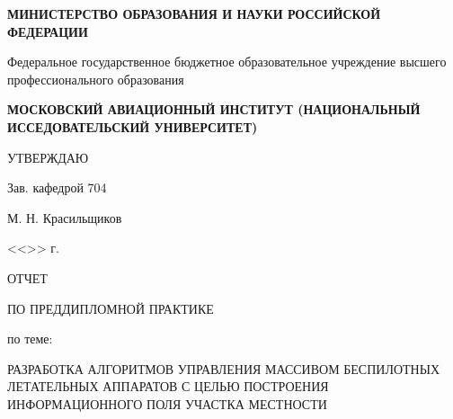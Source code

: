 \begin{titlepage}
\newpage

\def\tlb{\tabularnewline}

\begin{center}

    \textbf{МИНИСТЕРСТВО ОБРАЗОВАНИЯ И НАУКИ\lb
    РОССИЙСКОЙ ФЕДЕРАЦИИ}

    \vspace{0.5em}
    Федеральное государственное бюджетное образовательное учреждение\lb
    высшего профессионального образования
    \vspace{0.5em}

    \textbf{МОСКОВСКИЙ АВИАЦИОННЫЙ ИНСТИТУТ\lb
    (НАЦИОНАЛЬНЫЙ ИССЕДОВАТЕЛЬСКИЙ УНИВЕРСИТЕТ)}

\end{center}

\vspace{1.5em}

\begin{flushright}
    \begin{center}
        \hspace{10cm}
        УТВЕРЖДАЮ
    \end{center}

    \begin{flushleft}
        \hspace{10.5cm}
        Зав. кафедрой 704
    \end{flushleft}

    \underline{\hspace{3cm}} М. Н. Красильщиков

    <<\underline{\hspace{0.7cm}}>> \underline{\hspace{3.5cm}} \underline{\hspace{1.5cm}}г.

\end{flushright}

\begin{center}
    ОТЧЕТ

    ПО ПРЕДДИПЛОМНОЙ ПРАКТИКЕ

    \vspace{0.5em}

    по теме:

    \vspace{0.5em}

    РАЗРАБОТКА АЛГОРИТМОВ УПРАВЛЕНИЯ МАССИВОМ БЕСПИЛОТНЫХ
    ЛЕТАТЕЛЬНЫХ АППАРАТОВ С ЦЕЛЬЮ ПОСТРОЕНИЯ ИНФОРМАЦИОННОГО
    ПОЛЯ УЧАСТКА МЕСТНОСТИ
\end{center}


\end{titlepage}
